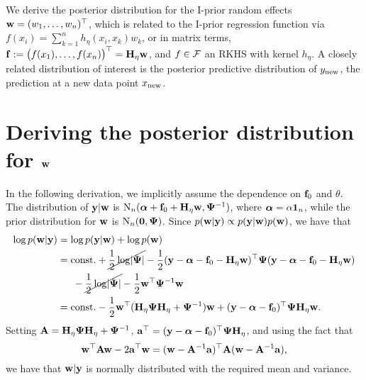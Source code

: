 We derive the posterior distribution for the I-prior random effects ${\mathbf w} = (w_1,\dots,w_n)^\top$, which is related to the I-prior regression function via $f(x_i) = \sum_{k=1}^n h_\eta(x_i,x_k)w_k$, or in matrix terms, ${\mathbf f} := \big(f(x_1),\dots,f(x_n)\big)^\top  = {\mathbf H}_\eta{\mathbf w}$, and $f \in {\mathcal F}$ an RKHS with kernel $h_\eta$.
A closely related distribution of interest is the posterior predictive distribution of $y_{\text{new}}$, the prediction at a new data point $x_{\text{new}}$.

\section[Deriving the posterior distribution for w]{Deriving the posterior distribution for ${\mathbf w}$}
\label{apx:posteriorw}

In the following derivation, we implicitly assume the dependence on ${\mathbf f}_0$ and $\theta$.
The distribution of ${\mathbf y}|{\mathbf w}$ is $\operatorname{N}_n({\bm\alpha} + {\mathbf f}_0 +{\mathbf H}_\eta{\mathbf w},{\bm\Psi}^{-1})$, where ${\bm\alpha} = \alpha{\mathbf 1}_n$, while the prior distribution for ${\mathbf w}$ is $\operatorname{N}_n({\mathbf 0},{\bm\Psi})$.
Since $p({\mathbf w}|{\mathbf y}) \propto p({\mathbf y}|{\mathbf w})p({\mathbf w})$, we have that
\begin{align*}
  \log p({\mathbf w}|{\mathbf y}) 
  &=  \log p({\mathbf y}|{\mathbf w}) + \log p({\mathbf w}) \\
  &= \text{const.}\hspace{0.01em} + \cancel{\frac{1}{2}\log\lvert{\bm\Psi}\rvert} - \frac{1}{2} ({\mathbf y} - {\bm\alpha} - {\mathbf f}_0 - {\mathbf H}_\eta{\mathbf w})^\top {\bm\Psi} ({\mathbf y} - {\bm\alpha} - {\mathbf f}_0 - {\mathbf H}_\eta{\mathbf w}) \\
  &\phantom{==} -\cancel{\frac{1}{2}\log\lvert{\bm\Psi}\rvert} - \frac{1}{2} {\mathbf w}^\top{\bm\Psi}^{-1}{\mathbf w} \\
  &= \text{const.}\hspace{0.01em} - \frac{1}{2} {\mathbf w}^\top({\mathbf H}_\eta{\bm\Psi}{\mathbf H}_\eta + {\bm\Psi}^{-1}){\mathbf w} + ({\mathbf y} - {\bm\alpha} - {\mathbf f}_0)^\top{\bm\Psi}{\mathbf H}_\eta{\mathbf w}.
\end{align*}
Setting ${\mathbf A} = {\mathbf H}_\eta{\bm\Psi}{\mathbf H}_\eta + {\bm\Psi}^{-1}$, ${\mathbf a}^\top = ({\mathbf y} - {\bm\alpha} - {\mathbf f}_0)^\top{\bm\Psi}{\mathbf H}_\eta$, and using the fact that 
\[
  {\mathbf w}^\top {\mathbf A} {\mathbf w} - 2 {\mathbf a}^\top{\mathbf w} = ({\mathbf w} - {\mathbf A}^{-1}{\mathbf a})^\top{\mathbf A}({\mathbf w} - {\mathbf A}^{-1}{\mathbf a}),
\]
we have that ${\mathbf w}|{\mathbf y}$ is normally distributed with the required mean and variance.

